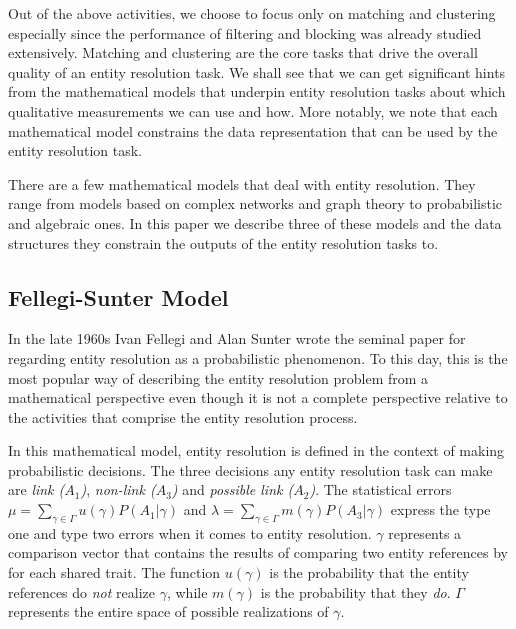 \documentclass[11pt]{article}
\begin{document}
    Out of the above activities, we choose to focus only on matching and
    clustering especially since the performance of filtering and blocking was
    already studied extensively\cite{Pap19}.
    Matching and clustering are the core tasks that drive the overall quality of
    an entity resolution task.
    We shall see that we can get significant hints from the mathematical models
    that underpin entity resolution tasks about which qualitative measurements
    we can use and how.
    More notably, we note that each mathematical model constrains the data
    representation that can be used by the entity resolution task.

    There are a few mathematical models that deal with entity resolution.
    They range from models based on complex networks and graph
    theory\cite{Li2020} to probabilistic and algebraic ones.
    In this paper we describe three of these models and the data structures they
    constrain the outputs of the entity resolution tasks to.

    \subsection[fsm]{Fellegi-Sunter Model}\label{subsec:fsm}

    In the late 1960s Ivan Fellegi and Alan Sunter wrote the seminal
    paper\cite{fs1969} for regarding entity resolution as a probabilistic
    phenomenon.
    To this day, this is the most popular way of describing the entity
    resolution problem from a mathematical perspective even though it is not
    a complete perspective relative to the activities that comprise the entity
    resolution process.

    In this mathematical model, entity resolution is defined in the context of
    making probabilistic decisions.
    The three decisions any entity resolution task can make are
    \textit{link ($A_1$)}, \textit{non-link ($A_3$)} and
    \textit{possible link ($A_2$)}.
    The statistical errors
    $\mu=\sum_{\gamma \in \varGamma}u(\gamma)P(A_1|\gamma)$ and
    $\lambda=\sum_{\gamma \in \varGamma}m(\gamma)P(A_3|\gamma)$ express the type
    one and type two errors when it comes to entity resolution.
    $\gamma$ represents a comparison vector that contains the results of
    comparing two entity references by for each shared trait. The function
    $u(\gamma)$ is the probability that the entity references do \textit{not}
    realize $\gamma$, while $m(\gamma)$ is the probability that they \textit{do}.
    $\varGamma$ represents the entire space of possible realizations of $\gamma$.
\end{document}
